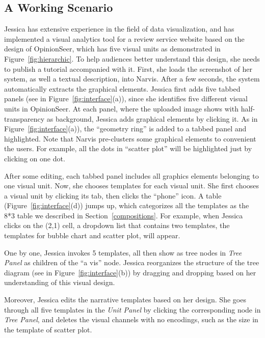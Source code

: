 \subsection{A Working Scenario}
Jessica has extensive experience in the field of data visualization, and has implemented a visual analytics tool for a review service website based on the design of OpinionSeer\cite{wu_opinionseer:_2010}, which has five visual units as demonstrated in Figure~\ref{fig:hierarchic}. To help audiences better understand this design, she needs to publish a tutorial accompanied with it.
First, she loads the screenshot of her system, as well a textual description, into Narvis.
After a few seconds, the system automatically extracts the graphical elements. Jessica first adds five tabbed panels (see in Figure~\ref{fig:interface}(a)), since she identifies five different visual units in OpinionSeer. At each panel, where the uploaded image shows with half-transparency as background, Jessica adds graphical elements by clicking it. As in Figure~\ref{fig:interface}(a)), the ``geometry ring'' is added to a tabbed panel and highlighted. Note that Narvis pre-clusters some graphical elements to convenient the users. For example, all the dots in ``scatter plot'' will be highlighted just by clicking on one dot. 

After some editing, each tabbed panel includes all graphics elements belonging to one visual unit. Now, she chooses templates for each visual unit. 
She first chooses a visual unit by clicking its tab, then clicks the ``phone'' icon. A table (Figure~\ref{fig:interface}(d)) jumps up, which categorizes all the templates as the 8*3 table we described in Section~\ref{compositions}. For example, when Jessica clicks on the (2,1) cell, a dropdown list that contains two templates, the templates for bubble chart and scatter plot, will appear.  

One by one, Jessica invokes 5 templates, all then show as tree nodes in \textit{Tree Panel} as children of the ``a vis'' node. Jessica reorganizes the structure of the tree diagram (see in Figure~\ref{fig:interface}(b)) by dragging and dropping based on her understanding of this visual design. 

Moreover, Jessica edits the narrative templates based on her design. 
She goes through all five templates in the \textit{Unit Panel} by clicking the corresponding node in \textit{Tree Panel}, and deletes the visual channels with no encodings, such as the size in the template of scatter plot. 

